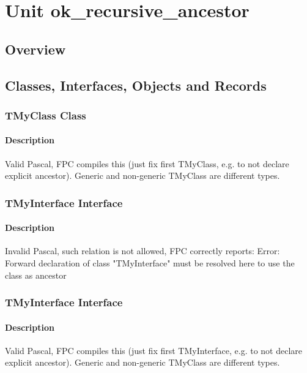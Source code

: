\documentclass{report}
\begin{document}
\newlength{\tmplength}
\chapter{Unit ok{\_}recursive{\_}ancestor}
\section{Overview}
\begin{description}
\item[\texttt{\begin{ttfamily}TMyClass\end{ttfamily} Class}]
\item[\texttt{\begin{ttfamily}TMyClass\end{ttfamily} Class}]
\item[\texttt{\begin{ttfamily}TMyInterface\end{ttfamily} Interface}]
\item[\texttt{\begin{ttfamily}TMyInterface\end{ttfamily} Interface}]
\end{description}
\section{Classes, Interfaces, Objects and Records}
\subsection*{TMyClass Class}
\subsubsection*{\large{\textbf{Description}}\normalsize\hspace{1ex}\hfill}
Valid Pascal, FPC compiles this (just fix first TMyClass, e.g. to not declare explicit ancestor). Generic and non{-}generic TMyClass are different types.\subsection*{TMyInterface Interface}
\subsubsection*{\large{\textbf{Description}}\normalsize\hspace{1ex}\hfill}
Invalid Pascal, such relation is not allowed, FPC correctly reports: Error: Forward declaration of class "TMyInterface" must be resolved here to use the class as ancestor\subsection*{TMyInterface Interface}
\subsubsection*{\large{\textbf{Description}}\normalsize\hspace{1ex}\hfill}
Valid Pascal, FPC compiles this (just fix first TMyInterface, e.g. to not declare explicit ancestor). Generic and non{-}generic TMyClass are different types.
\end{document}
